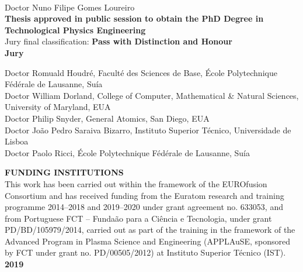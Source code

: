 \begin{titlepage}
\\\hspace{-2.5cm} \hspace{5.15cm} Doctor Nuno Filipe Gomes Loureiro
\\ \vspace{4mm}
\Large \textbf{Thesis approved in public session to obtain the PhD Degree in Technological Physics Engineering}
\\ \vspace{3mm}
\Large {Jury final classification: \textbf{Pass with Distinction and Honour}}
\\ \vspace{4mm}
\Large \textbf{Jury}
\\ \vspace{-1mm}
\begin{flushleft}
\hspace{-0.22cm} \large Doctor Romuald Houdré, Faculté des Sciences de Base, École Polytechnique Fédérale de Lausanne, Suí{}a\\
\hspace{-0.22cm}  \large Doctor William Dorland, College of Computer, Mathematical \& Natural Sciences, University of Maryland, EUA \\
\hspace{-0.22cm} Doctor Philip Snyder, General Atomics, San Diego, EUA\\
\hspace{-0.22cm} Doctor João Pedro Saraiva Bizarro, Instituto Superior Técnico, Universidade de Lisboa\\
\hspace{-0.22cm} Doctor Paolo Ricci, École Polytechnique Fédérale de Lausanne, Suí{}a\\
\end{flushleft}
\vspace{1mm}
\Large \textbf{FUNDING INSTITUTIONS}
 \\ \vspace{3mm}
\large {This work has been carried out within the framework of the EUROfusion Consortium and has received funding from the Euratom research and training programme 2014–2018 and 2019–2020 under grant agreement no. 633053, and from Portuguese FCT – Funda{}ão para a Ciência e Tecnologia, under grant PD/BD/105979/2014, carried out as part of the training in the framework of the Advanced Program in Plasma Science and Engineering (APPLAuSE, sponsored by FCT under grant no. PD/00505/2012) at Instituto Superior Técnico (IST).}
\vspace{5mm} \\
\Large \textbf{2019} \\
\let\thepage\relax
\pagebreak

\end{titlepage}



